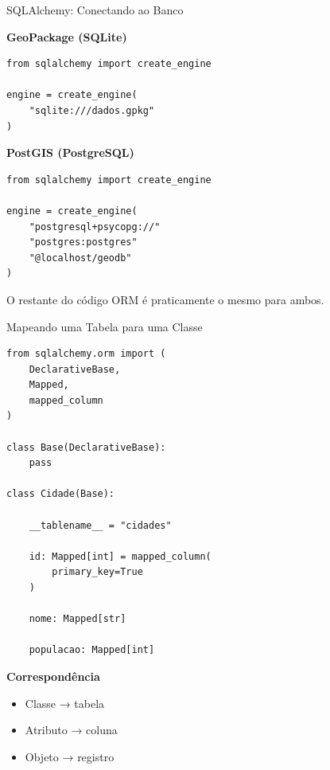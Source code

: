 \documentclass{beamer}
\begin{document}
\begin{frame}[fragile]{SQLAlchemy: Conectando ao Banco}

\textbf{GeoPackage (SQLite)}

\begin{verbatim}
from sqlalchemy import create_engine

engine = create_engine(
    "sqlite:///dados.gpkg"
)
\end{verbatim}

\vspace{0.3cm}

\textbf{PostGIS (PostgreSQL)}

\begin{verbatim}
from sqlalchemy import create_engine

engine = create_engine(
    "postgresql+psycopg://"
    "postgres:postgres"
    "@localhost/geodb"
)
\end{verbatim}

\vspace{0.3cm}

O restante do código ORM é praticamente o mesmo para ambos.

\end{frame}

\begin{frame}[fragile]{Mapeando uma Tabela para uma Classe}

\begin{verbatim}
from sqlalchemy.orm import (
    DeclarativeBase,
    Mapped,
    mapped_column
)

class Base(DeclarativeBase):
    pass

class Cidade(Base):

    __tablename__ = "cidades"

    id: Mapped[int] = mapped_column(
        primary_key=True
    )

    nome: Mapped[str]

    populacao: Mapped[int]
\end{verbatim}

\vspace{0.2cm}

\textbf{Correspondência}

\begin{itemize}
    \item Classe → tabela
    \item Atributo → coluna
    \item Objeto → registro
\end{itemize}

\end{frame}
\end{document}
